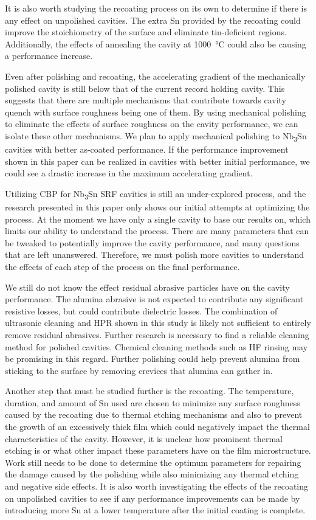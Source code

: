 It is also worth studying the recoating process on its own to determine if there is any effect on unpolished cavities. The extra Sn provided by the recoating could improve the stoichiometry of the surface and eliminate tin-deficient regions. Additionally, the effects of annealing the cavity at 1000~\unit{\celsius} could also be causing a performance increase.

Even after polishing and recoating, the accelerating gradient of the mechanically polished cavity is still below that of the current record holding cavity\cite{posen2021advances}. This suggests that there are multiple mechanisms that contribute towards cavity quench with surface roughness being one of them. By using mechanical polishing to eliminate the effects of surface roughness on the cavity performance, we can isolate these other mechanisms. We plan to apply mechanical polishing to Nb\textsubscript{3}Sn cavities with better as-coated performance. If the performance improvement shown in this paper can be realized in cavities with better initial performance, we could see a drastic increase in the maximum accelerating gradient.

Utilizing CBP for Nb\textsubscript{3}Sn SRF cavities is still an under-explored process, and the research presented in this paper only shows our initial attempts at optimizing the process. At the moment we have only a single cavity to base our results on, which limits our ability to understand the process. There are many parameters that can be tweaked to potentially improve the cavity performance, and many questions that are left unanswered. Therefore, we must polish more cavities to understand the effects of each step of the process on the final performance.

We still do not know the effect residual abrasive particles have on the cavity performance. The alumina abrasive is not expected to contribute any significant resistive losses, but could contribute dielectric losses. The combination of ultrasonic cleaning and HPR shown in this study is likely not sufficient to entirely remove residual abrasives. Further research is necessary to find a reliable cleaning method for polished cavities. Chemical cleaning methods such as HF rinsing may be promising in this regard. Further polishing could help prevent alumina from sticking to the surface by removing crevices that alumina can gather in.

Another step that must be studied further is the recoating. The temperature, duration, and amount of Sn used are chosen to minimize any surface roughness caused by the recoating due to thermal etching mechanisms and also to prevent the growth of an excessively thick film which could negatively impact the thermal characteristics of the cavity. However, it is unclear how prominent thermal etching is or what other impact these parameters have on the film microstructure. Work still needs to be done to determine the optimum parameters for repairing the damage caused by the polishing while also minimizing any thermal etching and negative side effects. It is also worth investigating the effects of the recoating on unpolished cavities to see if any performance improvements can be made by introducing more Sn at a lower temperature after the initial coating is complete.

